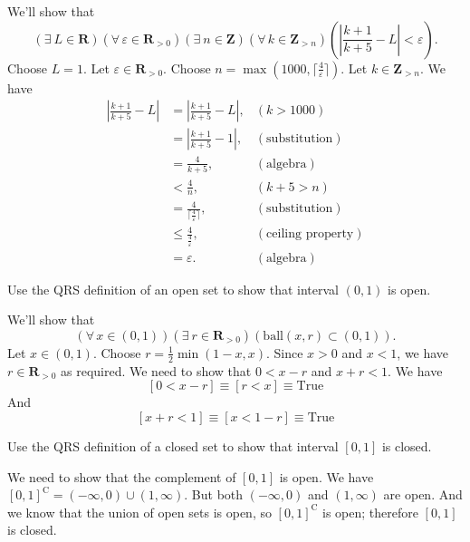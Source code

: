 \documentclass[12pt,fleqn,answers]{exam}
\newcommand{\reals}{\mathbf{R}}
\newcommand{\ball}{\mathrm{ball}}
\newcommand{\integers}{\mathbf{Z}}
\newcommand{\True}{\mathrm{True}}
\let\oldforall\forall
\renewcommand{\forall}{\oldforall \, }
\let\oldexist\exists
\renewcommand{\exists}{\oldexist \: }
\begin{document}
\begin{questions}
\begin{solution} We'll show that
\[
  (\exists L \in \reals)
  (\forall \varepsilon \in \reals_{>0})
  (\exists n \in \integers)
  (\forall k \in \integers_{>n})
  \left ( \left |  \frac{k+1}{k+5} - L \right | < \varepsilon \right ).
\]
Choose $L=1$.  Let $\varepsilon \in \reals_{>0}$.  Choose $n = \max(1000, \lceil \frac{4}{\varepsilon} \rceil)$.  Let $k \in \integers_{>n}$. We have
\begin{align*}
\left|  \frac{k+1}{k+5} - L \right | &=   \left |\frac{k+1}{k+5} - L \right |,   &(k > 1000) \\
                                         &= \left | \frac{k+1}{k+5} - 1 \right|,      & (\mbox{substitution}) \\
                                        &=   \frac{4}{k+5},             &(\mbox{algebra}) \\
                                        &<    \frac{4}{n},                &(k+5 > n) \\
                                        &=   \frac{4}{\lceil \frac{4}{\varepsilon} \rceil},  & (\mbox{substitution}) \\ 
                                        &\leq  \frac{4}{ \frac{4}{\varepsilon}},  & (\mbox{ceiling property})\\ 
                                        &= \varepsilon.  &(\mbox{algebra})
\end{align*}
\end{solution}

\question  Use the QRS definition of an open set to show that interval \((0,1)\) is open.
\begin{solution}  We'll show that
\[
   (\forall x \in (0,1))(\exists r \in \reals_{>0})(\ball(x,r) \subset (0,1)).
\]
Let $x \in (0,1)$.  Choose $r = \frac{1}{2} \min(1-x,x)$. Since
$x > 0$ and $x < 1$, we have $r \in \reals_{>0}$ as required.
We need to show that $0 < x - r$ and $x+r < 1$. We have
\[
    [0 < x-r ] \equiv [r < x] \equiv \True
\]
And
\[
    [x+r < 1 ] \equiv [x < 1-r] \equiv \True
\]
\end{solution}

\question  Use the QRS definition of a closed set to show that interval \([0,1]\) is closed.

\begin{solution} We need to show that the complement of  \([0,1]\) is open. We have
$ [0,1]^{\mathrm{C}} = (-\infty,0) \cup (1,\infty)$.  But both  $(-\infty,0)$  and $(1,\infty)$ are open. And we know that the union of
open sets is open, so  $[0,1]^{\mathrm{C}}$ is open; therefore \([0,1]\) is closed.


\end{solution}
\end{questions}
\end{document}
